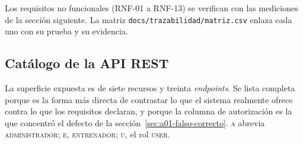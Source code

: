 \documentclass[11pt,a4paper]{article}
\newcommand{\ruta}[1]{\texttt{\footnotesize #1}}
\begin{document}
Los requisitos no funcionales (RNF-01 a RNF-13) se verifican con las
mediciones de la sección siguiente. La matriz
\ruta{docs/trazabilidad/matriz.csv} enlaza cada uno con su prueba y su
evidencia.

\subsection{Catálogo de la API REST}
\label{sec:catalogo-api}

La superficie expuesta es de siete recursos y treinta \emph{endpoints}. Se
lista completa porque es la forma más directa de contrastar lo que el
sistema realmente ofrece contra lo que los requisitos declaran, y porque la
columna de autorización es la que concentró el defecto de la
sección~\ref{sec:a01-falso-correcto}. \textsc{a} abrevia
\textsc{administrador}; \textsc{e}, \textsc{entrenador}; \textsc{u}, el rol
\textsc{user}.
\end{document}
